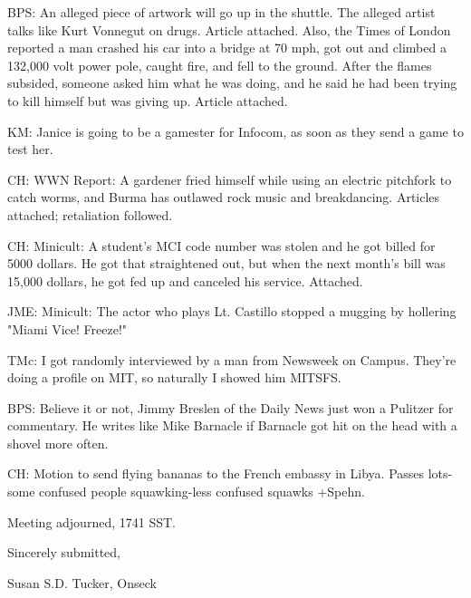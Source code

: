 \documentclass[12pt]{article}
\begin{document}
BPS: An alleged piece of artwork will go up in the shuttle. The alleged artist talks like Kurt Vonnegut on drugs. Article attached. Also, the Times of London reported a man crashed his car into a bridge at 70 mph, got out and climbed a 132,000 volt power pole, caught fire, and fell to the ground. After the flames subsided, someone asked him what he was doing, and he said he had been trying to kill himself but was giving up. Article attached.

KM: Janice is going to be a gamester for Infocom, as soon as they send a game to test her.

CH: WWN Report: A gardener fried himself while using an electric pitchfork to catch worms, and Burma has outlawed rock music and breakdancing. Articles attached; retaliation followed.

CH: Minicult: A student's MCI code number was stolen and he got billed for 5000 dollars. He got that straightened out, but when the next month's bill was 15,000 dollars, he got fed up and canceled his service. Attached.

JME: Minicult: The actor who plays Lt. Castillo stopped a mugging by hollering "Miami Vice! Freeze!"

TMc: I got randomly interviewed by a man from Newsweek on Campus. They're doing a profile on MIT, so naturally I showed him MITSFS.

BPS: Believe it or not, Jimmy Breslen of the Daily News just won a Pulitzer for commentary. He writes like Mike Barnacle if Barnacle got hit on the head with a shovel more often.

CH: Motion to send flying bananas to the French embassy in Libya. Passes lots-some confused people squawking-less confused squawks +Spehn.

\vspace{12pt}

\noindent
Meeting adjourned, 1741 SST.

\vspace{18pt}

\centerline{Sincerely submitted,}
\centerline{Susan S.D. Tucker, Onseck}
\end{document}
